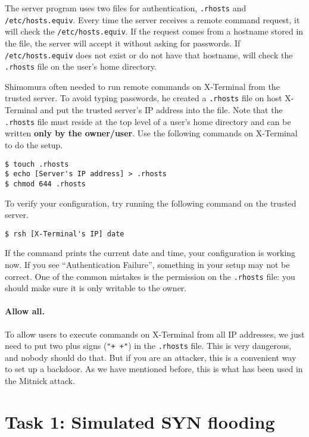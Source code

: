 The \rsh server program uses two files for authentication, 
\texttt{.rhosts} and \texttt{/etc/hosts.equiv}.
Every time the server receives a remote command request, it will check
the \texttt{/etc/hosts.equiv}. If the request comes from a hostname stored in the file, the
server will accept it without asking for passwords. 
If \texttt{/etc/hosts.equiv} does not exist or
do not have that hostname, \rsh  will check the \texttt{.rhosts} file 
on the user's home directory. 

Shimomura often needed to run remote commands on X-Terminal
from the trusted server. To avoid typing passwords, he
created a \texttt{.rhosts} file on host X-Terminal and put the trusted
server's IP address into the file.
Note that the \texttt{.rhosts} file must reside at the top level of a user's home directory and
can be written \textbf{only by the owner/user}. Use the following commands on X-Terminal to
do the setup.

\begin{lstlisting}
$ touch .rhosts
$ echo [Server's IP address] > .rhosts
$ chmod 644 .rhosts
\end{lstlisting}

To verify your configuration, try running the following command on the trusted server.
\begin{lstlisting}
$ rsh [X-Terminal's IP] date
\end{lstlisting}

If the command prints the current date and time, your configuration is working now. If you
see ``Authentication Failure'', something in your setup may not be correct. 
One of the common mistakes is the permission on the \texttt{.rhosts} file:
you should make sure it is only writable to the owner.


\paragraph{Allow all.} To allow users to execute commands on X-Terminal from 
all IP addresses, we just need to put two plus signs (\texttt{"+ +"})
in the \texttt{.rhosts} file. This is very dangerous, and nobody should 
do that. But if you are an attacker, this is a convenient way
to set up a backdoor. As we have mentioned before, this is what has been used in
the Mitnick attack. 



\section{Task 1: Simulated SYN flooding}

